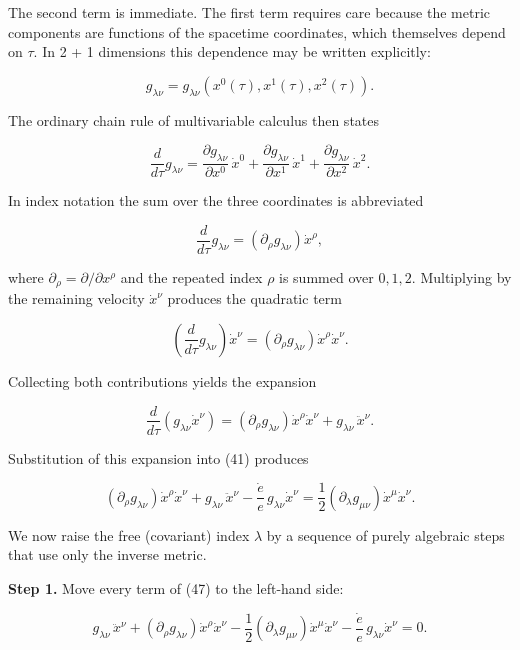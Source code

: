 \documentclass[
]{article}
\begin{document}
The second term is immediate. The first term requires care because the
metric components are functions of the spacetime coordinates, which
themselves depend on \(\tau\). In 2 + 1 dimensions this dependence may
be written explicitly:

\[g_{\lambda\nu} = g_{\lambda\nu}\left( x^{0}(\tau), x^{1}(\tau), x^{2}(\tau) \right).\]

The ordinary chain rule of multivariable calculus then states

\[\frac{d}{d\tau} g_{\lambda\nu} = \frac{\partial g_{\lambda\nu}}{\partial x^{0}}\, \dot{x}^{0} + \frac{\partial g_{\lambda\nu}}{\partial x^{1}}\, \dot{x}^{1} + \frac{\partial g_{\lambda\nu}}{\partial x^{2}}\, \dot{x}^{2}. \tag{43}\]

In index notation the sum over the three coordinates is abbreviated

\[\frac{d}{d\tau} g_{\lambda\nu} = \left( \partial_{\rho} g_{\lambda\nu} \right) \dot{x}^{\rho}, \tag{44}\]

where \(\partial_{\rho} = \partial / \partial x^{\rho}\) and the
repeated index \(\rho\) is summed over \(0, 1, 2\). Multiplying by the
remaining velocity \(\dot{x}^{\nu}\) produces the quadratic term

\[\left( \frac{d}{d\tau} g_{\lambda\nu} \right) \dot{x}^{\nu} = \left( \partial_{\rho} g_{\lambda\nu} \right) \dot{x}^{\rho} \dot{x}^{\nu}. \tag{45}\]

Collecting both contributions yields the expansion

\[\frac{d}{d\tau} \left( g_{\lambda\nu} \dot{x}^{\nu} \right) = \left( \partial_{\rho} g_{\lambda\nu} \right) \dot{x}^{\rho} \dot{x}^{\nu} + g_{\lambda\nu}\, \ddot{x}^{\nu}. \tag{46}\]

Substitution of this expansion into (41) produces

\[\left( \partial_{\rho} g_{\lambda\nu} \right) \dot{x}^{\rho} \dot{x}^{\nu} + g_{\lambda\nu}\, \ddot{x}^{\nu} - \frac{\dot{e}}{e}\, g_{\lambda\nu} \dot{x}^{\nu} = \frac{1}{2} \left( \partial_{\lambda} g_{\mu\nu} \right) \dot{x}^{\mu} \dot{x}^{\nu}. \tag{47}\]

We now raise the free (covariant) index \(\lambda\) by a sequence of
purely algebraic steps that use only the inverse metric.

\textbf{Step 1.} Move every term of (47) to the left-hand side:

\[g_{\lambda\nu}\, \ddot{x}^{\nu} + \left( \partial_{\rho} g_{\lambda\nu} \right) \dot{x}^{\rho} \dot{x}^{\nu} - \frac{1}{2} \left( \partial_{\lambda} g_{\mu\nu} \right) \dot{x}^{\mu} \dot{x}^{\nu} - \frac{\dot{e}}{e}\, g_{\lambda\nu} \dot{x}^{\nu} = 0. \tag{48}\]
\end{document}
